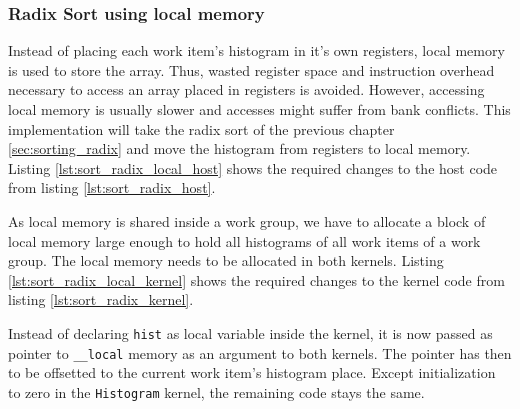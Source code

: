 \subsubsection{Radix Sort using local memory}
\label{sec:sorting_radix_local}

Instead of placing each work item's histogram in it's own registers, local memory is used to store the array. Thus, wasted register space and instruction overhead necessary to access an array placed in registers is avoided. However, accessing local memory is usually slower and accesses might suffer from bank conflicts. This implementation will take the radix sort of the previous chapter \ref{sec:sorting_radix} and move the histogram from registers to local memory.
Listing \ref{lst:sort_radix_local_host} shows the required changes to the host code from listing \ref{lst:sort_radix_host}.



As local memory is shared inside a work group, we have to allocate a block of local memory large enough to hold all histograms of all work items of a work group. The local memory needs to be allocated in both kernels.
Listing \ref{lst:sort_radix_local_kernel} shows the required changes to the kernel code from listing \ref{lst:sort_radix_kernel}.



Instead of declaring \lstinline!hist! as local variable inside the kernel, it is now passed as pointer to \lstinline!__local! memory as an argument to both kernels. The pointer has then to be offsetted to the current work item's histogram place. Except initialization to zero in the \lstinline!Histogram! kernel, the remaining code stays the same.

